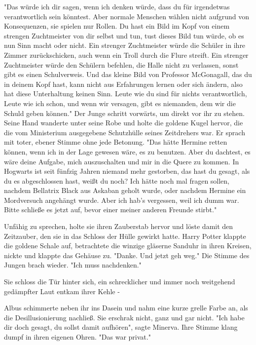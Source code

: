{"Das würde ich dir sagen, wenn ich denken würde, dass du für irgendetwas verantwortlich sein könntest. Aber normale Menschen wählen nicht aufgrund von Konsequenzen, sie spielen nur Rollen. Du hast ein Bild im Kopf von einem strengen Zuchtmeister von dir selbst und tun, tust dieses Bild tun würde, ob es nun Sinn macht oder nicht. Ein strenger Zuchtmeister würde die Schüler in ihre Zimmer zurückschicken, auch wenn ein Troll durch die Flure streift. Ein strenger Zuchtmeister würde den Schülern befehlen, die Halle nicht zu verlassen, sonst gibt es einen Schulverweis. Und das kleine Bild von Professor McGonagall, das du in deinem Kopf hast, kann nicht aus Erfahrungen lernen oder sich ändern, also hat diese Unterhaltung keinen Sinn. Leute wie du sind für nichts verantwortlich, Leute wie ich schon, und wenn wir versagen, gibt es niemanden, dem wir die Schuld geben können." Der Junge schritt vorwärts, um direkt vor ihr zu stehen. Seine Hand wanderte unter seine Robe und holte die goldene Kugel hervor, die die vom Ministerium ausgegebene Schutzhülle seines Zeitdrehers war. Er sprach mit toter, ebener Stimme ohne jede Betonung. "Das hätte Hermine retten können, wenn ich in der Lage gewesen wäre, es zu benutzen. Aber du dachtest, es wäre deine Aufgabe, mich auszuschalten und mir in die Quere zu kommen. In Hogwarts ist seit fünfzig Jahren niemand mehr gestorben, das hast du gesagt, als du es abgeschlossen hast, weißt du noch? Ich hätte noch mal fragen sollen, nachdem Bellatrix Black aus Askaban geholt wurde, oder nachdem Hermine ein Mordversuch angehängt wurde. Aber ich hab's vergessen, weil ich dumm war. Bitte schließe es jetzt auf, bevor einer meiner anderen Freunde stirbt."

Unfähig zu sprechen, holte sie ihren Zauberstab hervor und löste damit den Zeitzauber, den sie in das Schloss der Hülle gewirkt hatte. Harry Potter klappte die goldene Schale auf, betrachtete die winzige gläserne Sanduhr in ihren Kreisen, nickte und klappte das Gehäuse zu. "Danke. Und jetzt geh weg." Die Stimme des Jungen brach wieder. "Ich muss nachdenken."

Sie schloss die Tür hinter sich, ein schrecklicher und immer noch weitgehend gedämpfter Laut entkam ihrer Kehle -

Albus schimmerte neben ihr ins Dasein und nahm eine kurze grelle Farbe an, als die Desillusionierung nachließ. Sie erschrak nicht, ganz und gar nicht. "Ich habe dir doch gesagt, du sollst damit aufhören", sagte Minerva. Ihre Stimme klang dumpf in ihren eigenen Ohren. "Das war privat."

}

